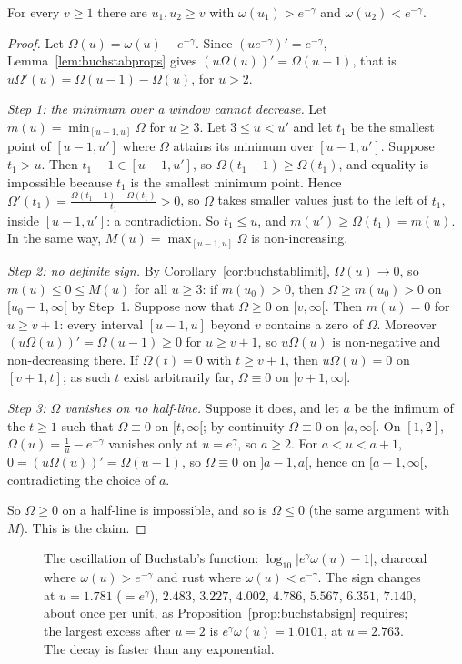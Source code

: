 \begin{proposition}\label{prop:buchstabsign}
For every $v\ge1$ there are $u_1,u_2\ge v$ with $\omega(u_1)>e^{-\gamma}$ and $\omega(u_2)<e^{-\gamma}$.
\end{proposition}
\begin{proof}
Let $\Omega(u)=\omega(u)-e^{-\gamma}$. Since $(ue^{-\gamma})'=e^{-\gamma}$, Lemma~\ref{lem:buchstabprops} gives $(u\Omega(u))'=\Omega(u-1)$, that is $u\Omega'(u)=\Omega(u-1)-\Omega(u)$, for $u>2$.

\emph{Step 1: the minimum over a window cannot decrease.} Let $m(u)=\min_{[u-1,u]}\Omega$ for $u\ge3$. Let $3\le u<u'$ and let $t_1$ be the smallest point of $[u-1,u']$ where $\Omega$ attains its minimum over $[u-1,u']$. Suppose $t_1>u$. Then $t_1-1\in[u-1,u']$, so $\Omega(t_1-1)\ge\Omega(t_1)$, and equality is impossible because $t_1$ is the smallest minimum point. Hence $\Omega'(t_1)=\frac{\Omega(t_1-1)-\Omega(t_1)}{t_1}>0$, so $\Omega$ takes smaller values just to the left of $t_1$, inside $[u-1,u']$: a contradiction. So $t_1\le u$, and $m(u')\ge\Omega(t_1)=m(u)$. In the same way, $M(u)=\max_{[u-1,u]}\Omega$ is non-increasing.

\emph{Step 2: no definite sign.} By Corollary~\ref{cor:buchstablimit}, $\Omega(u)\to0$, so $m(u)\le0\le M(u)$ for all $u\ge3$: if $m(u_0)>0$, then $\Omega\ge m(u_0)>0$ on $[u_0-1,\infty[$ by Step~1. Suppose now that $\Omega\ge0$ on $[v,\infty[$. Then $m(u)=0$ for $u\ge v+1$: every interval $[u-1,u]$ beyond $v$ contains a zero of $\Omega$. Moreover $(u\Omega(u))'=\Omega(u-1)\ge0$ for $u\ge v+1$, so $u\Omega(u)$ is non-negative and non-decreasing there. If $\Omega(t)=0$ with $t\ge v+1$, then $u\Omega(u)=0$ on $[v+1,t]$; as such $t$ exist arbitrarily far, $\Omega\equiv0$ on $[v+1,\infty[$.

\emph{Step 3: $\Omega$ vanishes on no half-line.} Suppose it does, and let $a$ be the infimum of the $t\ge1$ such that $\Omega\equiv0$ on $[t,\infty[$; by continuity $\Omega\equiv0$ on $[a,\infty[$. On $[1,2]$, $\Omega(u)=\frac1u-e^{-\gamma}$ vanishes only at $u=e^\gamma$, so $a\ge2$. For $a<u<a+1$, $0=(u\Omega(u))'=\Omega(u-1)$, so $\Omega\equiv0$ on $]a-1,a[$, hence on $[a-1,\infty[$, contradicting the choice of $a$.

So $\Omega\ge0$ on a half-line is impossible, and so is $\Omega\le0$ (the same argument with $M$). This is the claim.
\end{proof}

\begin{figure}[ht]
\centering{}
\caption{The oscillation of Buchstab's function: $\log_{10}|e^\gamma\omega(u)-1|$, charcoal where $\omega(u)>e^{-\gamma}$ and rust where $\omega(u)<e^{-\gamma}$. The sign changes at $u=1.781$ ($=e^\gamma$), $2.483$, $3.227$, $4.002$, $4.786$, $5.567$, $6.351$, $7.140$, about once per unit, as Proposition~\ref{prop:buchstabsign} requires; the largest excess after $u=2$ is $e^\gamma\omega(u)=1.0101$, at $u=2.763$. The decay is faster than any exponential.}
\label{fig:buchstab}
\end{figure}

